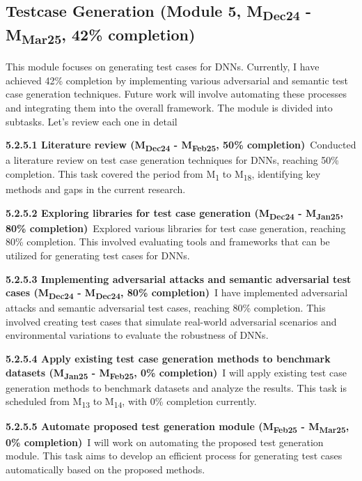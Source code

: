 \subsection{Testcase Generation (Module 5, M\textsubscript{Dec24} - M\textsubscript{Mar25}, 42\% completion)} This module focuses on generating test cases for DNNs. Currently, I have achieved 42\% completion by implementing various adversarial and semantic test case generation techniques. Future work will involve automating these processes and integrating them into the overall framework. The module is divided into subtasks. Let's review each one in detail

\noindent \textbf{5.2.5.1 Literature review (M\textsubscript{Dec24} - M\textsubscript{Feb25}, 50\% completion)}\ Conducted a literature review on test case generation techniques for DNNs, reaching 50\% completion. This task covered the period from M\textsubscript{1} to M\textsubscript{18}, identifying key methods and gaps in the current research.

\noindent \textbf{5.2.5.2 Exploring libraries for test case generation (M\textsubscript{Dec24} - M\textsubscript{Jan25}, 80\% completion)}\ Explored various libraries for test case generation, reaching 80\% completion. This involved evaluating tools and frameworks that can be utilized for generating test cases for DNNs.

\noindent \textbf{5.2.5.3 Implementing adversarial attacks and semantic adversarial test cases (M\textsubscript{Dec24} - M\textsubscript{Dec24}, 80\% completion)}\ I have implemented adversarial attacks and semantic adversarial test cases, reaching 80\% completion. This involved creating test cases that simulate real-world adversarial scenarios and environmental variations to evaluate the robustness of DNNs.

\noindent \textbf{5.2.5.4 Apply existing test case generation methods to benchmark datasets (M\textsubscript{Jan25} - M\textsubscript{Feb25}, 0\% completion)}\ I will apply existing test case generation methods to benchmark datasets and analyze the results. This task is scheduled from M\textsubscript{13} to M\textsubscript{14}, with 0\% completion currently.

\noindent \textbf{5.2.5.5 Automate proposed test generation module (M\textsubscript{Feb25} - M\textsubscript{Mar25}, 0\% completion)}\ I will work on automating the proposed test generation module. This task aims to develop an efficient process for generating test cases automatically based on the proposed methods.

